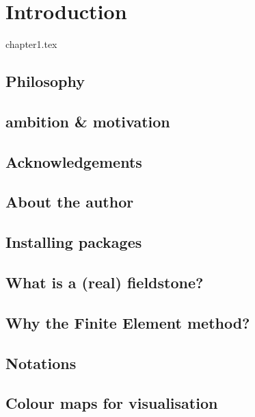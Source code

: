 \chapter{Introduction} %

\begin{flushright} {\tiny {\color{gray} chapter1.tex}} \end{flushright}

\section{Philosophy}  %
\section{ambition \& motivation}  %
\section{Acknowledgements}  %
\section{About the author}  %
\section{Installing packages}  %
\section{What is a (real) fieldstone?}  %
\section{Why the Finite Element method?}  %
\section{Notations}  %
\section{Colour maps for visualisation}  %
